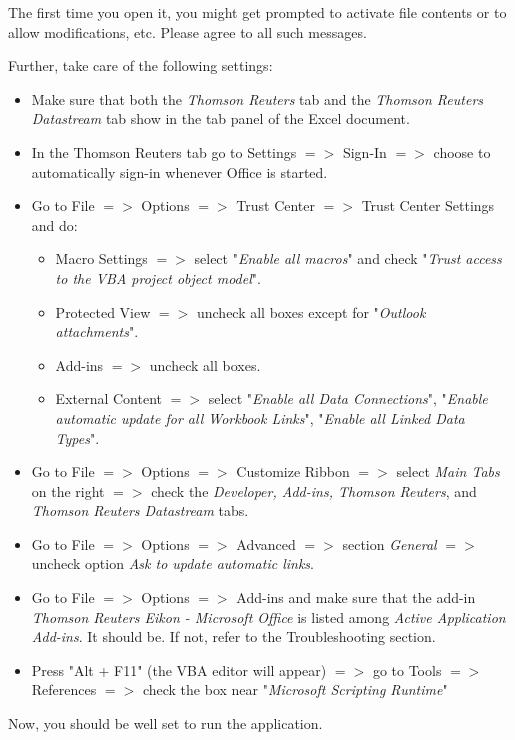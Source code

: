 The first time you open it, you might get prompted to activate file contents or to allow modifications, etc. Please agree to all such messages. 

Further, take care of the following settings: 
\begin{itemize}
	\item Make sure that both the \textit{Thomson Reuters} tab and the \textit{Thomson Reuters Datastream} tab show in the tab panel of the Excel document. 
	\item In the Thomson Reuters tab go to Settings $=>$ Sign-In $=>$ choose to automatically sign-in whenever Office is started. 
	\item Go to File $ => $ Options $ => $ Trust Center $ => $ Trust Center Settings and do: 
	\begin{itemize}
		\item Macro Settings $ => $ select "\textit{Enable all macros}" and check "\textit{Trust access to the VBA project object model}". 
		\item Protected View $ => $ uncheck all boxes except for "\textit{Outlook attachments}". 
		\item Add-ins $ => $ uncheck all boxes.
		\item External Content $ => $ select "\textit{Enable all Data Connections}", "\textit{Enable automatic update for all Workbook Links}", "\textit{Enable all Linked Data Types}".
	\end{itemize}
	\item Go to File $ => $ Options $ => $ Customize Ribbon $ => $ select \textit{Main Tabs} on the right $ => $ check the \textit{Developer, Add-ins, Thomson Reuters}, and \textit{Thomson Reuters Datastream} tabs. 
	\item Go to File $ => $ Options $ => $ Advanced $ => $ section \textit{General} $ => $ uncheck option \textit{Ask to update automatic links}. 
	\item Go to File $ => $ Options $ => $ Add-ins and make sure that the add-in \textit{Thomson Reuters Eikon - Microsoft Office }is listed among \textit{Active Application Add-ins}. It should be. If not, refer to the Troubleshooting section. 
	\item Press "Alt + F11" (the VBA editor will appear) $ => $ go to Tools $ => $ References $ => $ check the box near "\textit{Microsoft Scripting Runtime}"
\end{itemize}

Now, you should be well set to run the application.


